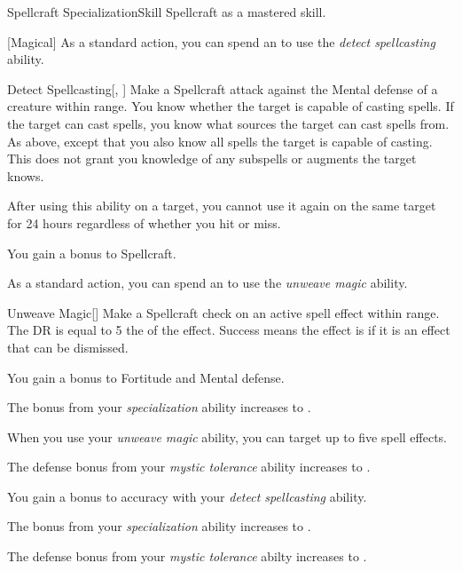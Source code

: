     \begin{feat}{Spellcraft Specialization}{Skill}
        \featpre Spellcraft as a mastered skill.

        [Magical] As a standard action, you can spend an  to use the \textit{detect spellcasting} ability.
        \begin{ability}{Detect Spellcasting}[, ]
            Make a Spellcraft attack against the Mental defense of a creature within \rngmed range.
            \hit You know whether the target is capable of casting spells.
            If the target can cast spells, you know what sources the target can cast spells from.
            \crit As above, except that you also know all spells the target is capable of casting.
            This does not grant you knowledge of any subspells or augments the target knows.

            After using this ability on a target, you cannot use it again on the same target for 24 hours regardless of whether you hit or miss.
        \end{ability}

         You gain a  bonus to Spellcraft.

         As a standard action, you can spend an  to use the \textit{unweave magic} ability.
        \begin{ability}{Unweave Magic}[]
            Make a Spellcraft check on an active spell effect within \rngmed range.
            The DR is equal to 5 \add the  of the effect.
            Success means the effect is  if it is an effect that can be dismissed.
        \end{ability}

         You gain a  bonus to Fortitude and Mental defense.

         The bonus from your \textit{specialization} ability increases to .

         When you use your \textit{unweave magic} ability, you can target up to five spell effects.

         The defense bonus from your \textit{mystic tolerance} ability increases to .

         You gain a  bonus to accuracy with your \textit{detect spellcasting} ability.

         The bonus from your \textit{specialization} ability increases to .

         The defense bonus from your \textit{mystic tolerance} abilty increases to .
    \end{feat}

